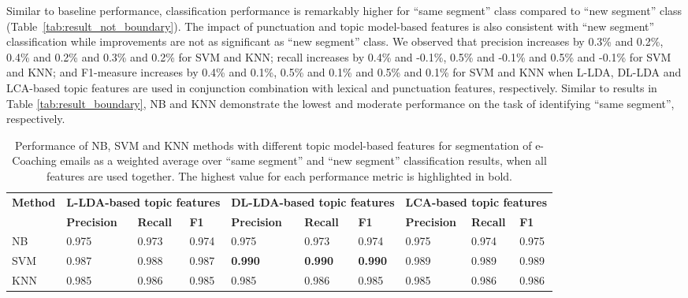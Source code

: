 \documentclass{amia}
\begin{document}
Similar to baseline performance, classification performance is remarkably higher for ``same segment'' class compared to ``new segment'' class (Table~\ref{tab:result_not_boundary}). The impact of punctuation and topic model-based features is also consistent with ``new segment'' classification while improvements are not as significant as ``new segment'' class. We observed that precision increases by 0.3\% and 0.2\%, 0.4\% and 0.2\% and 0.3\% and 0.2\% for SVM and KNN; recall increases by 0.4\% and -0.1\%, 0.5\% and -0.1\% and 0.5\% and -0.1\% for SVM and KNN; and F1-measure increases by 0.4\% and 0.1\%, 0.5\% and 0.1\% and 0.5\% and 0.1\% for SVM and KNN when L-LDA, DL-LDA and LCA-based topic features are used in conjunction combination with lexical and punctuation features, respectively. Similar to results in Table \ref{tab:result_boundary}, NB and KNN demonstrate the lowest and moderate performance on the task of identifying ``same segment'', respectively. \\   

\begin{table}[ht]
\centering
\caption{Performance of NB, SVM and KNN methods with different topic model-based features for segmentation of e-Coaching emails as a weighted average over ``same segment'' and ``new segment'' classification results, when all features are used together. The highest value for each performance metric is highlighted in bold.}
\label{tab:result_weighted_avg}
  \begin{tabular}{|l|l|l|l|l|l|l|l|l|l|}
  \hline
   \multirow{2}{*}{\textbf{Method}} & \multicolumn{3}{|c|}{\textbf{L-LDA-based topic features}} & \multicolumn{3}{|c|}{\textbf{DL-LDA-based topic features}}  & \multicolumn{3}{|c|}{\textbf{LCA-based topic features}} \\\cline{2-10} & \textbf{Precision}  & \textbf{Recall} & \textbf{F1} & \textbf{Precision}  & \textbf{Recall} & \textbf{F1} & \textbf{Precision}  & \textbf{Recall} & \textbf{F1}\\ \hline  
    
 NB & 0.975 & 0.973 & 0.974 & 0.975 & 0.973 & 0.974 & 0.975 & 0.974 & 0.975 \\ \hline
 SVM & 0.987 & 0.988 & 0.987 & \textbf{0.990} & \textbf{0.990} & \textbf{0.990} & 0.989 & 0.989 & 0.989 \\ \hline
 KNN & 0.985 & 0.986 & 0.985 & 0.985 & 0.986 & 0.985 & 0.985 & 0.986 & 0.986 \\ \hline
  \end{tabular}
\end{table}         
\end{document}
